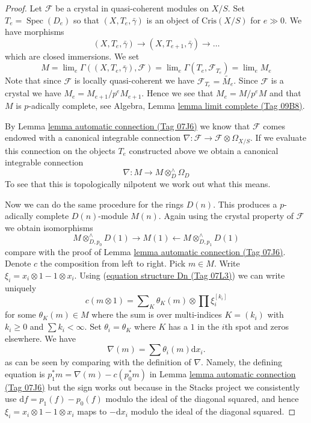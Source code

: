 \documentclass{amsart}
\theoremstyle{plain}
\theoremstyle{definition}
\theoremstyle{remark}
\numberwithin{equation}{subsection}
\def\lim{\mathop{\mathrm{lim}}\nolimits}
\def\Spec{\mathop{\mathrm{Spec}}}
\begin{document}
\begin{proof}
Let $\mathcal{F}$ be a crystal in quasi-coherent modules on $X/S$.
Set $T_e = \Spec(D_e)$ so that $(X, T_e, \bar\gamma)$ is an object
of $\text{Cris}(X/S)$ for $e \gg 0$. We have morphisms
$$
(X, T_e, \bar\gamma) \to (X, T_{e + 1}, \bar\gamma) \to \ldots
$$
which are closed immersions. We set
$$
M =
\lim_e \Gamma((X, T_e, \bar\gamma), \mathcal{F}) =
\lim_e \Gamma(T_e, \mathcal{F}_{T_e}) = \lim_e M_e
$$
Note that since $\mathcal{F}$ is locally quasi-coherent we have
$\mathcal{F}_{T_e} = \widetilde{M_e}$. Since $\mathcal{F}$ is a
crystal we have $M_e = M_{e + 1}/p^eM_{e + 1}$. Hence we see that
$M_e = M/p^eM$ and that $M$ is $p$-adically complete, see
Algebra, Lemma \href{https://stacks.math.columbia.edu/tag/09B8}{lemma limit complete (Tag 09B8)}.

\medskip\noindent
By Lemma \href{https://stacks.math.columbia.edu/tag/07J6}{lemma automatic connection (Tag 07J6)} we know that $\mathcal{F}$
comes endowed with a canonical integrable connection
$\nabla : \mathcal{F} \to \mathcal{F} \otimes \Omega_{X/S}$.
If we evaluate this connection on the objects $T_e$ constructed above
we obtain a canonical integrable connection
$$
\nabla : M \longrightarrow M \otimes^\wedge_D \Omega_D
$$
To see that this is topologically nilpotent we work out what this means.

\medskip\noindent
Now we can do the same procedure for the rings $D(n)$.
This produces a $p$-adically complete $D(n)$-module $M(n)$. Again using
the crystal property of $\mathcal{F}$ we obtain isomorphisms
$$
M \otimes^\wedge_{D, p_0} D(1) \rightarrow M(1)
\leftarrow M \otimes^\wedge_{D, p_1} D(1)
$$
compare with the proof of Lemma \href{https://stacks.math.columbia.edu/tag/07J6}{lemma automatic connection (Tag 07J6)}.
Denote $c$ the composition from left to right. Pick $m \in M$.
Write $\xi_i = x_i \otimes 1 - 1 \otimes x_i$.
Using (\href{https://stacks.math.columbia.edu/tag/07L3}{equation structure Dn (Tag 07L3)}) we can write uniquely
$$
c(m \otimes 1) = \sum\nolimits_K \theta_K(m) \otimes \prod \xi_i^{[k_i]}
$$
for some $\theta_K(m) \in M$ where the sum is over multi-indices
$K = (k_i)$ with $k_i \geq 0$ and $\sum k_i < \infty$. Set
$\theta_i = \theta_K$ where $K$ has a $1$ in the $i$th spot and
zeros elsewhere. We have
$$
\nabla(m) = \sum \theta_i(m) \text{d}x_i.
$$
as can be seen by comparing with the definition of
$\nabla$. Namely, the defining equation is
$p_1^*m = \nabla(m) - c(p_0^*m)$ in Lemma \href{https://stacks.math.columbia.edu/tag/07J6}{lemma automatic connection (Tag 07J6)}
but the sign works out because in the Stacks project we consistently use
$\text{d}f = p_1(f) - p_0(f)$ modulo the ideal of the diagonal squared,
and hence $\xi_i = x_i \otimes 1 - 1 \otimes x_i$ maps to $-\text{d}x_i$
modulo the ideal of the diagonal squared.


\end{proof}
\end{document}
